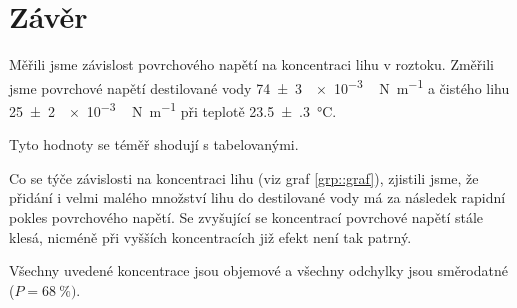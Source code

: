 \section*{Závěr}
Měřili jsme  závislost povrchového napětí na koncentraci lihu v roztoku.
Změřili jsme povrchové napětí destilované vody \SI{74(3)}{\num{e-3}\,\newton \per \metre} a čistého lihu \SI{25(2)}{\num{e-3}\,\newton \per \metre} při teplotě \SI{23.5(3)}{\degreeCelsius}.

Tyto hodnoty se téměř shodují s tabelovanými.

Co se týče závislosti na koncentraci lihu (viz graf \ref{grp::graf}), zjistili jsme, že přidání i velmi malého množství lihu do destilované vody má za následek rapidní pokles povrchového napětí.
Se zvyšující se koncentrací povrchové napětí stále klesá, nicméně při vyšších koncentracích již efekt není tak patrný.

Všechny uvedené koncentrace jsou objemové a všechny odchylky jsou směrodatné ($P=\SI{68}{\percent})$.